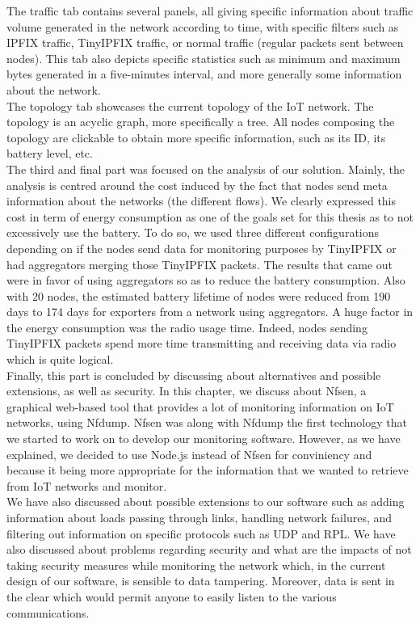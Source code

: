 The traffic tab contains several panels, all giving specific information about traffic volume generated in the network according to time, with specific filters such as IPFIX traffic, TinyIPFIX traffic, or normal traffic (regular packets sent between nodes). This tab also depicts specific statistics such as minimum and maximum bytes generated in a five-minutes interval, and more generally some information about the network. \\

The topology tab showcases the current topology of the IoT network. The topology is an acyclic graph, more specifically a tree. All nodes composing the topology are clickable to obtain more specific information, such as its ID, its battery level, etc.\\

The third and final part was focused on the analysis of our solution. Mainly, the analysis is centred around the cost induced by the fact that nodes send meta information about the networks (the different flows). We clearly expressed this cost in term of energy consumption as one of the goals set for this thesis as to not excessively use the battery. To do so, we used three different configurations depending on if the nodes send data for monitoring purposes by TinyIPFIX or had aggregators merging those TinyIPFIX packets. The results that came out were in favor of using aggregators so as to reduce the battery consumption. Also with 20 nodes, the estimated battery lifetime of nodes were reduced from 190 days to 174 days for exporters from a network using aggregators. A huge factor in the energy consumption was the radio usage time. Indeed, nodes sending TinyIPFIX packets spend more time transmitting and receiving data via radio which is quite logical.\\

Finally, this part is concluded by discussing about alternatives and possible extensions, as well as security. In this chapter, we discuss about Nfsen, a graphical web-based tool that provides a lot of monitoring information on IoT networks, using Nfdump. Nfsen was along with Nfdump the first technology that we started to work on to develop our monitoring software. However, as we have explained, we decided to use Node.js instead of Nfsen for conviniency and because it being more appropriate for the information that we wanted to retrieve from IoT networks and monitor. \\

We have also discussed about possible extensions to our software such as adding information about loads passing through links, handling network failures, and filtering out information on specific protocols such as UDP and RPL. We have also discussed about problems regarding security and what are the impacts of not taking security measures while monitoring the network which, in the current design of our software, is sensible to data tampering. Moreover, data is sent in the clear which would permit anyone to easily listen to the various communications.\\


